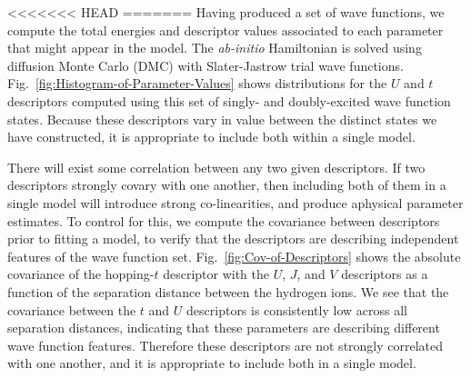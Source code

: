 <<<<<<< HEAD
%
%
=======
Having produced a set of wave functions, we compute the total energies and descriptor values associated to each parameter that might appear in the model. The \textit{ab-initio} Hamiltonian is solved using diffusion Monte Carlo (DMC) with Slater-Jastrow trial wave functions. Fig.~\ref{fig:Histogram-of-Parameter-Values} shows distributions for the $U$ and $t$ descriptors computed using this set of singly- and doubly-excited wave function states.  Because these descriptors vary in value between the distinct states we have constructed, it is appropriate to include both within a single model.

 There will exist some correlation between any two given descriptors. If two descriptors strongly covary with one another, then including both of them in a single model will introduce strong co-linearities, and produce aphysical parameter estimates. To control for this, we compute the covariance between descriptors prior to fitting a model, to verify that the descriptors are describing independent features of the wave function set. Fig.~\ref{fig:Cov-of-Descriptors} shows the absolute covariance of the hopping-$t$ descriptor with the $U$, $J$, and $V$ descriptors as a function of the separation distance between the hydrogen ions. We see that the covariance between the $t$ and $U$ descriptors is consistently low across all separation distances, indicating that these parameters are describing different wave function features. Therefore these descriptors are not strongly correlated with one another, and it is appropriate to include both in a single model.


